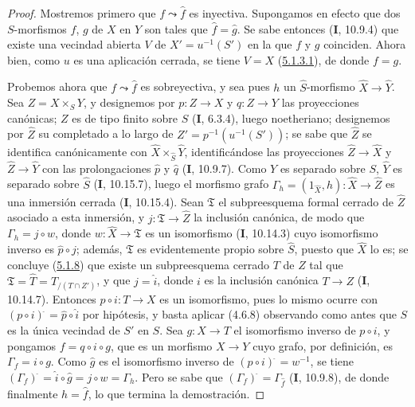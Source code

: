 \begin{proof}
Mostremos primero que $f\leadsto\widehat f$ es inyectiva. Supongamos en efecto que dos
$S$-morfismos $f$, $g$ de $X$ en $Y$ son tales que $\widehat f=\widehat g$.
Se sabe entonces (\textbf{I}, 10.9.4) que existe una vecindad abierta $V$ de
$X'=u^{-1}(S')$ en la que $f$ y $g$ coinciden. Ahora bien, como $u$ es una aplicación
cerrada, se tiene $V=X$ (\hyperref[III.5.1.3.1-fr]{5.1.3.1}), de donde $f=g$.

Probemos ahora que $f\leadsto\widehat f$ es sobreyectiva, y sea pues $h$ un
$\widehat S$-morfismo $\widehat X\to\widehat Y$. Sea $Z=X\times_S Y$, y
designemos por $p:Z\to X$ y $q:Z\to Y$ las proyecciones canónicas; $Z$ es de
tipo finito sobre $S$ (\textbf{I}, 6.3.4), luego noetheriano; designemos por $\widehat Z$ su
completado a lo largo de $Z'=p^{-1}(u^{-1}(S'))$; se sabe que $\widehat Z$ se identifica
canónicamente con $\widehat X\times_{\widehat S}\widehat Y$, identificándose las proyecciones
$\widehat Z\to\widehat X$ y $\widehat Z\to\widehat Y$ con las
prolongaciones $\widehat p$ y $\widehat q$ (\textbf{I}, 10.9.7). Como $Y$ es separado sobre
$S$, $\widehat Y$ es separado sobre $\widehat S$ (\textbf{I}, 10.15.7), luego el morfismo
grafo
$\Gamma_h=(1_{\widehat X},h):\widehat X\to\widehat Z$
es una inmersión cerrada (\textbf{I}, 10.15.4). Sean $\mathfrak T$ el subpreesquema
formal cerrado de $\widehat Z$ asociado a esta inmersión, y
$j:\mathfrak T\to\widehat Z$ la inclusión canónica, de modo que
$\Gamma_h=j\circ w$, donde $w:\widehat X\to\mathfrak T$ es un isomorfismo
(\textbf{I}, 10.14.3) cuyo isomorfismo inverso es $\widehat p\circ j$; además,
$\mathfrak T$ es evidentemente propio sobre $\widehat S$, puesto que $\widehat X$ lo es;
se concluye (\hyperref[III.5.1.8-fr]{5.1.8}) que existe un subpreesquema
cerrado $T$ de $Z$ tal que
$\mathfrak T=\widehat T=T_{/(T\cap Z')}$, y que $j=\widehat i$, donde $i$ es
la inclusión canónica $T\to Z$ (\textbf{I}, 10.14.7). Entonces $p\circ i:T\to X$ es un
isomorfismo, pues lo mismo ocurre con
$(p\circ i)^{\widehat{\,}}=\widehat p\circ\widehat i$ por hipótesis, y basta
aplicar
(4.6.8) observando como antes que $S$ es la única vecindad de $S'$ en $S$.
Sea $g:X\to T$ el isomorfismo inverso de $p\circ i$, y pongamos
$f=q\circ i\circ g$, que es un morfismo $X\to Y$ cuyo grafo, por definición, es
$\Gamma_f=i\circ g$. Como $\widehat g$ es el isomorfismo inverso de
$(p\circ i)^{\widehat{\,}}=w^{-1}$, se tiene
$(\Gamma_f)^{\widehat{\,}}=\widehat i\circ\widehat g=j\circ w=\Gamma_h$.
Pero se sabe que $(\Gamma_f)^{\widehat{\,}}=\Gamma_{\widehat f}$ (\textbf{I}, 10.9.8), de donde
finalmente $h=\widehat f$, lo que termina la demostración.
\end{proof}

